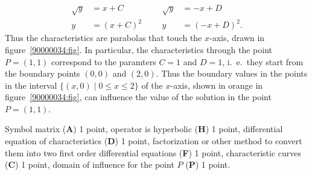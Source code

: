 \begin{loesung}
\begin{teilaufgaben}
\begin{align*}
\sqrt{y} &=  x + C
&&&
\sqrt{y} &= -x + D
\\
y &= (x+C)^2
&&&
y &= (-x+D)^2.
\end{align*}
Thus the characteristics are parabolas that touch the $x$-axis, drawn
in figure~\ref{90000034:fig}.
In particular, the characteristics through the point $P=(1,1)$
correspond to the paramters $C=1$ and $D=1$, i.~e.~they start from
the boundary points $(0,0)$ and $(2,0)$.
Thus the boundary values in the points in the interval
$\{ (x,0)\mid 0\le x\le 2\}$ of the $x$-axis, shown in orange in
figure~\ref{90000034:fig}, can influence
the value of the solution in the point $P=(1,1)$.
\qedhere
\end{teilaufgaben}
\end{loesung}


\begin{bewertung}
Symbol matrix ({\bf A}) 1 point,
operator is hyperbolic ({\bf H}) 1 point,
differential equation of characteristics ({\bf D}) 1 point,
factorization or other method to convert them into two first order
differential equations ({\bf F}) 1 point,
characteristic curves ({\bf C}) 1 point,
domain of influence for the point $P$ ({\bf P}) 1 point.
\end{bewertung}

